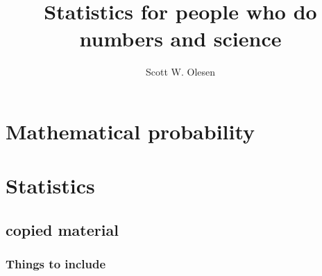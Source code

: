 \documentclass{book}
\title{Statistics for people who do numbers and science}
\author{Scott W. Olesen}
\begin{document}
\maketitle

\frontmatter



\mainmatter



\part{Mathematical probability}




\part{Statistics}






\chapter{copied material}

\section{Things to include}\label{things-to-include}
\end{document}
